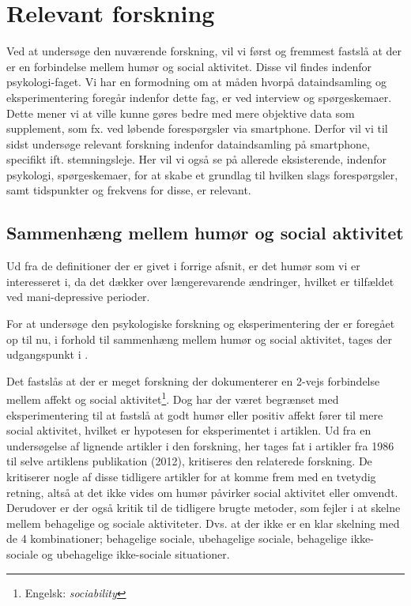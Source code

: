 

\chapter{Relevant forskning}
Ved at undersøge den nuværende forskning, vil vi først og fremmest fastslå at der er en forbindelse mellem humør og social aktivitet.
Disse vil findes indenfor psykologi-faget.
Vi har en formodning om at måden hvorpå dataindsamling og eksperimentering foregår indenfor dette fag, er ved interview og spørgeskemaer.
Dette mener vi at ville kunne gøres bedre med mere objektive data som supplement, som fx. ved løbende forespørgsler via smartphone.
Derfor vil vi til sidst undersøge relevant forskning indenfor dataindsamling på smartphone, specifikt ift. stemningsleje.
Her vil vi også se på allerede eksisterende, indenfor psykologi, spørgeskemaer, for at skabe et grundlag til hvilken slags forespørgsler, samt tidspunkter og frekvens for disse, er relevant.

\section{Sammenhæng mellem humør og social aktivitet}
Ud fra de definitioner der er givet i forrige afsnit, er det humør som vi er interesseret i, da det dækker over længerevarende ændringer, hvilket er tilfældet ved mani-depressive perioder.

For at undersøge den psykologiske forskning og eksperimentering der er foregået op til nu, i forhold til sammenhæng mellem humør og social aktivitet, tages der udgangspunkt i \citet{whelan}.

Det fastslås at der er meget forskning der dokumenterer en 2-vejs forbindelse mellem affekt og social aktivitet\footnote{Engelsk: \textit{sociability}}.
Dog har der været begrænset med eksperimentering til at fastslå at godt humør eller positiv affekt fører til mere social aktivitet, hvilket er hypotesen for eksperimentet i artiklen.
Ud fra en undersøgelse af lignende artikler i den forskning, her tages fat i artikler fra 1986 til selve artiklens publikation (2012), kritiseres den relaterede forskning.
De kritiserer nogle af disse tidligere artikler for at komme frem med en tvetydig retning, altså at det ikke vides om humør påvirker social aktivitet eller omvendt.
Derudover er der også kritik til de tidligere brugte metoder, som fejler i at skelne mellem behagelige og sociale aktiviteter.
Dvs. at der ikke er en klar skelning med de 4 kombinationer; behagelige sociale, ubehagelige sociale, behagelige ikke-sociale og ubehagelige ikke-sociale situationer.


